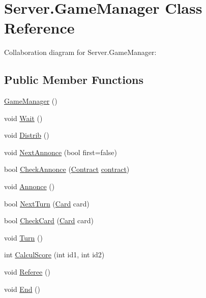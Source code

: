 \hypertarget{class_server_1_1_game_manager}{}\section{Server.\+Game\+Manager Class Reference}
\label{class_server_1_1_game_manager}


Collaboration diagram for Server.\+Game\+Manager\+:
\subsection*{Public Member Functions}
\begin{DoxyCompactItemize}
\item 
\hyperlink{class_server_1_1_game_manager_af92b9cb93c22d1751486c11c7f49a26f}{Game\+Manager} ()
\item 
void \hyperlink{class_server_1_1_game_manager_a07eb113db9a00aefdb565068ed532915}{Wait} ()
\item 
void \hyperlink{class_server_1_1_game_manager_abe3cba330255ade16dfadbf6d2bcbed7}{Distrib} ()
\item 
void \hyperlink{class_server_1_1_game_manager_a157fc5f3ae7eba10807e18e682f0403a}{Next\+Annonce} (bool first=false)
\item 
bool \hyperlink{class_server_1_1_game_manager_a28c391b5fd915d1f4ac422d9b4fe509e}{Check\+Annonce} (\hyperlink{class_game_1_1_contract}{Contract} \hyperlink{class_server_1_1_game_manager_af24c716c34949ff495b9a47eec59d88c}{contract})
\item 
void \hyperlink{class_server_1_1_game_manager_a8f9c1e139a56849d75ecbe8ab73243ac}{Annonce} ()
\item 
bool \hyperlink{class_server_1_1_game_manager_a94b83f44ca6b2f3a70d9f5ad0af19696}{Next\+Turn} (\hyperlink{class_game_1_1_card}{Card} card)
\item 
bool \hyperlink{class_server_1_1_game_manager_a4a32016560d748cc8c272ebfb793f22c}{Check\+Card} (\hyperlink{class_game_1_1_card}{Card} card)
\item 
void \hyperlink{class_server_1_1_game_manager_afe22c5dc89cdc68d8361540b541acd30}{Turn} ()
\item 
int \hyperlink{class_server_1_1_game_manager_a7a5ac01d26fc1536d5376e982023e736}{Calcul\+Score} (int id1, int id2)
\item 
void \hyperlink{class_server_1_1_game_manager_a290183cdbe0ad1767906d5d5c0ac4e54}{Referee} ()
\item 
void \hyperlink{class_server_1_1_game_manager_a7e771aa3a76446d77d872386fb4984d9}{End} ()
\end{DoxyCompactItemize}
